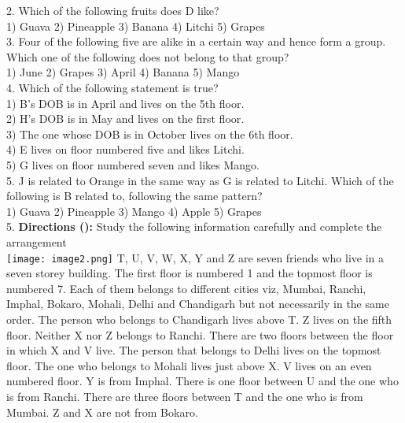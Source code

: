 \documentclass[
]{article}
\begin{document}
2. Which of the following fruits does D like?\\
1) Guava \hspace{2mm}2) Pineapple \hspace{2mm}3) Banana \hspace{2mm}4) Litchi \hspace{2mm}5) Grapes\\

3. Four of the following five are alike in a certain way and hence form a group. Which one
of the following does not belong to that group?\\
1) June \hspace{2mm}2) Grapes \hspace{2mm}3) April \hspace{2mm}4) Banana \hspace{2mm}5) Mango\\

4. Which of the following statement is true?\\
1) B’s DOB is in April and lives on the 5th floor.\\
2) H’s DOB is in May and lives on the first floor.\\
3) The one whose DOB is in October lives on the 6th floor.\\
4) E lives on floor numbered five and likes Litchi.\\
5) G lives on floor numbered seven and likes Mango.\\

5. J is related to Orange in the same way as G is related to Litchi. Which of the following is
B related to, following the same pattern?\\
1) Guava \hspace{2mm}2) Pineapple \hspace{2mm}3) Mango \hspace{2mm}4) Apple \hspace{2mm}5) Grapes\\

5. \textbf{Directions ():} Study the following information carefully and complete the arrangement\\
\texttt{[image: image2.png]}
T, U, V, W, X, Y and Z are seven friends who live in a seven storey building. The first floor is
numbered 1 and the topmost floor is numbered 7. Each of them belongs to different cities
viz, Mumbai, Ranchi, Imphal, Bokaro, Mohali, Delhi and Chandigarh but not necessarily in
the same order. The person who belongs to Chandigarh lives above T. Z lives on the fifth
floor. Neither X nor Z belongs to Ranchi. There are two floors between the floor in which X
and V live. The person that belongs to Delhi lives on the topmost floor. The one who
belongs to Mohali lives just above X. V lives on an even numbered floor. Y is from Imphal.
There is one floor between U and the one who is from Ranchi. There are three floors
between T and the one who is from Mumbai. Z and X are not from Bokaro.\\
\end{document}
